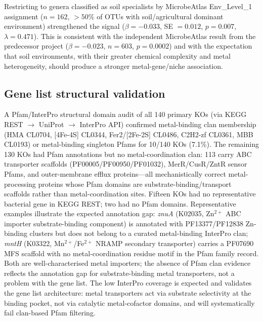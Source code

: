 \documentclass[times]{zHenriquesLab-StyleBioRxiv}
\begin{document}
Restricting to genera classified as soil specialists by MicrobeAtlas
Env\_Level\_1 assignment ($n = 162$, ${>}50\%$ of OTUs with soil/agricultural
dominant environment) strengthened the signal ($\beta = -0.033$, SE $= 0.012$,
$p = 0.007$, $\lambda = 0.471$). This is consistent with the independent
MicrobeAtlas result from the predecessor project ($\beta = -0.023$, $n = 603$,
$p = 0.0002$) and with the expectation that soil environments, with their
greater chemical complexity and metal heterogeneity, should produce a stronger
metal-gene/niche association.



\subsection{Gene list structural validation}
\label{ss:structural}

A Pfam/InterPro structural domain audit of all 140 primary KOs (via KEGG REST
$\to$ UniProt $\to$ InterPro API) confirmed metal-binding clan membership
(HMA CL0704, [4Fe-4S] CL0344, Fer2/[2Fe-2S] CL0486, C2H2-zf CL0361,
MBB CL0193) or metal-binding singleton Pfams for 10/140 KOs (7.1\%). The
remaining 130 KOs had Pfam annotations but no metal-coordination clan: 113 carry
ABC transporter scaffolds (PF00005/PF00950/PF01032), MerR/CusR/ZntR sensor
Pfams, and outer-membrane efflux proteins---all mechanistically correct
metal-processing proteins whose Pfam domains are substrate-binding/transport
scaffolds rather than metal-coordination sites. Fifteen KOs had no
representative bacterial gene in KEGG REST; two had no Pfam domains.
Representative examples illustrate the expected annotation gap: \textit{znuA} (K02035,
Zn$^{2+}$ ABC importer substrate-binding component) is annotated with
PF13377/PF12838 Zn-binding clusters but does not belong to a curated
metal-binding InterPro clan; \textit{mntH} (K03322, Mn$^{2+}$/Fe$^{2+}$ NRAMP
secondary transporter) carries a PF07690 MFS scaffold with no
metal-coordination residue motif in the Pfam family record. Both are
well-characterised metal importers; the absence of Pfam clan evidence reflects
the annotation gap for substrate-binding metal transporters, not a problem with
the gene list. The low InterPro coverage is expected and validates the gene list
architecture: metal transporters act via substrate selectivity at the binding
pocket, not via catalytic metal-cofactor domains, and will systematically fail
clan-based Pfam filtering.
\end{document}
